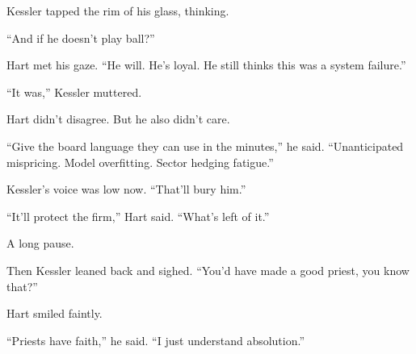 Kessler tapped the rim of his glass, thinking.

``And if he doesn’t play ball?''

Hart met his gaze. ``He will. He’s loyal. He still thinks this was a system failure.''

``It was,'' Kessler muttered.

Hart didn’t disagree. But he also didn’t care.

``Give the board language they can use in the minutes,'' he said. ``Unanticipated mispricing. 
Model overfitting. Sector hedging fatigue.''

Kessler’s voice was low now. ``That’ll bury him.''

``It’ll protect the firm,'' Hart said. ``What’s left of it.''

A long pause.

Then Kessler leaned back and sighed. ``You’d have made a good priest, you know that?''

Hart smiled faintly.

``Priests have faith,'' he said. ``I just understand absolution.''

\medskip

